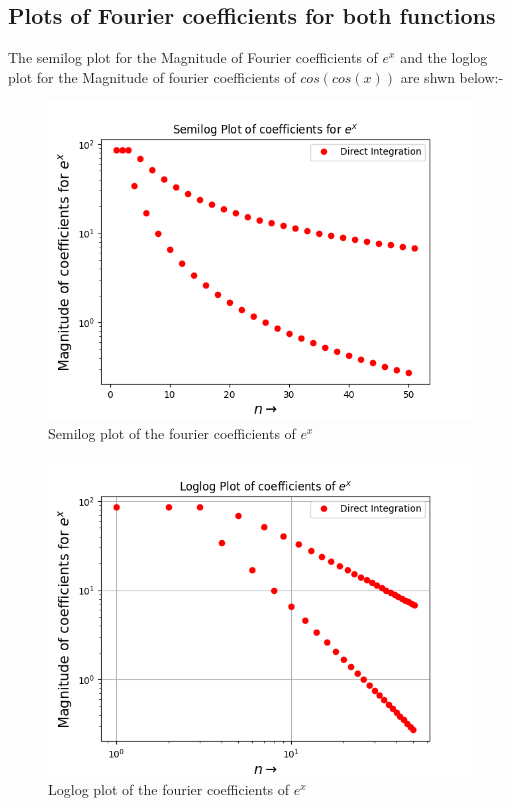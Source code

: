\documentclass[11pt, a4paper]{article}
\begin{document}
   
\subsection*{Plots of Fourier coefficients for both functions }
The semilog plot for the Magnitude of Fourier coefficients of  $e^{x}$ and the loglog plot for the Magnitude of fourier coefficients of $cos(cos(x))$ are shwn below:-
	\begin{figure}[!tbh]
   	\centering
   	\includegraphics[scale=0.5]{Ass4_Figure_3.png}   
   	\caption{Semilog plot of the fourier coefficients of $e^{x}$}
   	\label{fig:sample}
   \end{figure} 

	\begin{figure}[!tbh]
   	\centering
   	\includegraphics[scale=0.5]{Ass4_Figure_4.png}   
   	\caption{Loglog plot of the fourier coefficients of $e^{x}$}
   	\label{fig:sample}
   \end{figure} 
   \cleardoublepage
   
\end{document}
